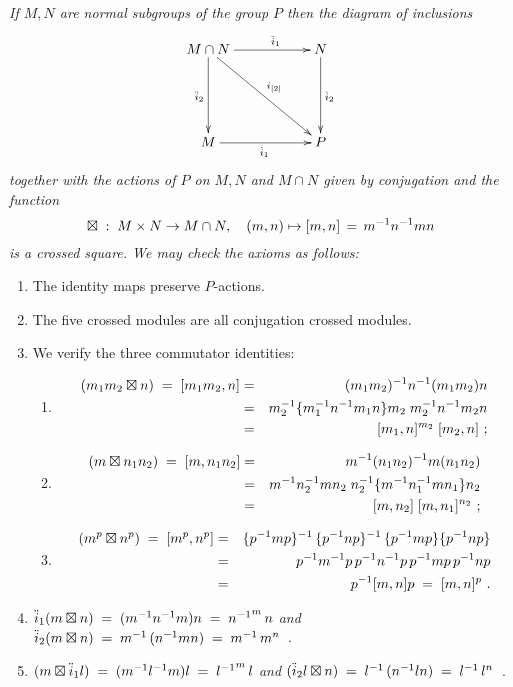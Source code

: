 \begin{example}
\emph{If $M, N$ are normal subgroups of the group $P$ 
then the diagram of inclusions}
$$
\xymatrix{
M \cap N \ar[rr]^(0.6){\ddiio} \ar[dd]_{\ddiit} \ar[rrdd]^{\iiot} 
  && N \ar[dd]^{\diit} \\
       \\
M \ar[rr]_{\diio}  
  && P 
}
$$
\emph{together with the actions of $P$ on $M, N$ 
and $M \cap N$ given by conjugation and the function}
$$
\boxtimes \;:\; M \times N \to M\cap N, \quad (m,n) \mapsto [m,n]\,=\,m^{-1}n^{-1}mn
$$
\emph{is a crossed square.
We may check the axioms as follows:}
\begin{enumerate}[{\rm (a)}]
\item
The identity maps preserve $P$-actions.
\item
The five crossed modules are all conjugation crossed modules.
\item
We verify the three commutator identities:
\begin{enumerate}[{\rm (i)}]
\item
\begin{eqnarray*}
(m_1m_2 \boxtimes n) \;=\; [m_1m_2,n] 
  & = &  (m_1m_2)^{-1} n^{-1} (m_1m_2) n  \\
  & = &  m_2^{-1}\{m_1^{-1}n^{-1}m_1n\}m_2\;m_2^{-1} n^{-1} m_2 n  \\
  & = &  [m_1,n]^{m_2}\;[m_2,n]~;  
\end{eqnarray*}
\item
\begin{eqnarray*}
(m \boxtimes n_1n_2) \;=\; [m,n_1n_2] 
  & = &  m^{-1} (n_1n_2)^{-1} m (n_1n_2)  \\
  & = &  m^{-1} n_2^{-1} m n_2\;n_2^{-1}\{m^{-1}n_1^{-1}mn_1\}n_2  \\
  & = &  [m,n_2]\;[m,n_1]^{n_2}~;
\end{eqnarray*}
\item
\vspace{-5mm}
\begin{eqnarray*}
(m^p \boxtimes n^p) \;=\; [m^p,n^p]
  & = &  \{p^{-1}mp\}^{-1}\,\{p^{-1}np\}^{-1}\,\{p^{-1}mp\}\{p^{-1}np\}  \\
  & = &  p^{-1}m^{-1}p\,p^{-1}n^{-1}p\,p^{-1}mp\,p^{-1}np \\
  & = &  p^{-1}[m,n]p \;=\; [m,n]^p ~.
\end{eqnarray*}
\end{enumerate}
\item\quad
$\ddot{i}_1 (m \boxtimes n) \;=\; (m^{-1}n^{-1}m)n \;=\; {n^{-1}}^m\,n$
\quad \emph{and} \quad
$\ddot{i}_2 (m \boxtimes n) \;=\; m^{-1}\,(n^{-1}mn) \;=\; m^{-1}\,m^n$~.
\item\quad
$(m \boxtimes \ddot{i}_1 l) \;=\; (m^{-1}l^{-1}m)l \;=\; {l^{-1}}^m\,l$
\quad \emph{and} \quad
$(\ddot{i}_2 l \boxtimes n) \;=\; l^{-1}\,(n^{-1}ln) \;=\; l^{-1}\,l^n$~.
\end{enumerate}
\end{example}

